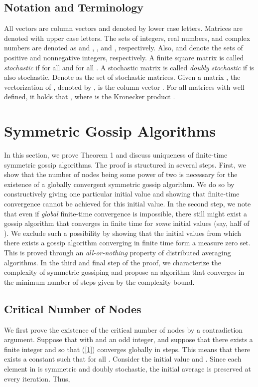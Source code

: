 \documentclass[a4paper, 11pt]{article}
\begin{document}
{
\subsection*{Notation and Terminology}
All vectors are column vectors and denoted by lower case letters. Matrices are denoted
with upper case letters. The sets of  integers, real numbers,  and complex numbers are denoted as and , , and  ,  respectively. Also,  and  denote the sets of positive and nonnegative integers, respectively.    A finite square matrix  is called {\em stochastic} if  for all  and  for all  \cite{Latouche1999}.  A stochastic matrix  is called {\em doubly stochastic} if  is also  stochastic. Denote   as the set of  stochastic matrices. Given a matrix , the vectorization of , denoted by , is the  column vector  . For all  matrices  with  well defined, it holds that  , where  {is} the Kronecker product \cite{Horn}.
}
\section{Symmetric Gossip Algorithms}\label{Sec:Symmetric}
In this section, we prove Theorem 1 and discuss uniqueness of finite-time symmetric gossip algorithms. The proof is structured in several steps. First, we show that the number of nodes being some power of two is necessary for the existence of a globally convergent symmetric gossip algorithm. We do so by constructively giving one particular initial value and showing that finite-time convergence cannot be achieved for this initial value. In the second step, we note that even if {\it global} finite-time convergence is impossible, there still might exist a gossip algorithm that converges in finite time  for \emph{some} initial values (say, half of ).  We exclude such a possibility by showing that the initial values from which there exists a gossip algorithm converging in finite time  form a measure zero set. This is proved through an {\em all-or-nothing} property of distributed averaging algorithms.  In the third and final step of the proof, we characterize the complexity of symmetric gossiping and propose an algorithm that converges in the minimum number of steps given by the complexity bound.



\subsection{Critical Number of Nodes} We first prove the existence of the critical number of nodes by a contradiction argument.  Suppose that  with  and  an odd integer, and suppose that there exists a finite integer  and  so that (\ref{1}) converges globally in  steps.  This means that there exists a constant  such that  for all .
Consider the initial value  and . Since each element in  is symmetric and doubly stochastic, the initial average is preserved at every iteration. Thus,
\end{document}
